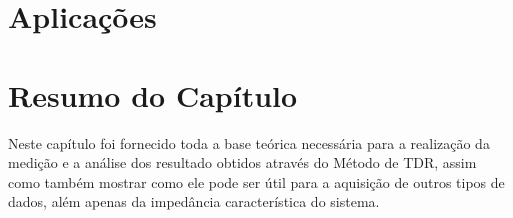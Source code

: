\section{Aplicações}

\section{Resumo do Capítulo}

Neste capítulo foi fornecido toda a base teórica necessária para a realização da medição e a análise dos resultado obtidos através do Método de TDR, assim como também mostrar como ele pode ser útil para a aquisição de outros tipos de dados, além apenas da impedância característica do sistema.

